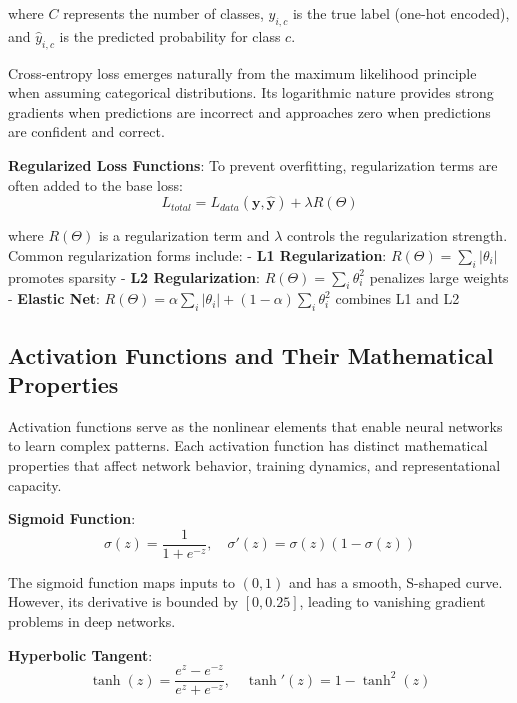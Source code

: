 \documentclass[11pt,a4paper]{report}
\begin{document}
where $C$ represents the number of classes, $y_{i,c}$ is the true label (one-hot encoded), and $\hat{y}_{i,c}$ is the predicted probability for class $c$.

Cross-entropy loss emerges naturally from the maximum likelihood principle when assuming categorical distributions. Its logarithmic nature provides strong gradients when predictions are incorrect and approaches zero when predictions are confident and correct.

\textbf{Regularized Loss Functions}: To prevent overfitting, regularization terms are often added to the base loss:
\begin{equation}
L_{total} = L_{data}(\mathbf{y}, \hat{\mathbf{y}}) + \lambda R(\Theta)
\end{equation}

where $R(\Theta)$ is a regularization term and $\lambda$ controls the regularization strength. Common regularization forms include:
- \textbf{L1 Regularization}: $R(\Theta) = \sum_{i} |\theta_i|$ promotes sparsity
- \textbf{L2 Regularization}: $R(\Theta) = \sum_{i} \theta_i^2$ penalizes large weights
- \textbf{Elastic Net}: $R(\Theta) = \alpha \sum_{i} |\theta_i| + (1-\alpha) \sum_{i} \theta_i^2$ combines L1 and L2

\subsection{Activation Functions and Their Mathematical Properties}

Activation functions serve as the nonlinear elements that enable neural networks to learn complex patterns. Each activation function has distinct mathematical properties that affect network behavior, training dynamics, and representational capacity.

\textbf{Sigmoid Function}:
\begin{equation}
\sigma(z) = \frac{1}{1 + e^{-z}}, \quad \sigma'(z) = \sigma(z)(1 - \sigma(z))
\end{equation}

The sigmoid function maps inputs to $(0, 1)$ and has a smooth, S-shaped curve. However, its derivative is bounded by $[0, 0.25]$, leading to vanishing gradient problems in deep networks.

\textbf{Hyperbolic Tangent}:
\begin{equation}
\tanh(z) = \frac{e^z - e^{-z}}{e^z + e^{-z}}, \quad \tanh'(z) = 1 - \tanh^2(z)
\end{equation}
\end{document}
